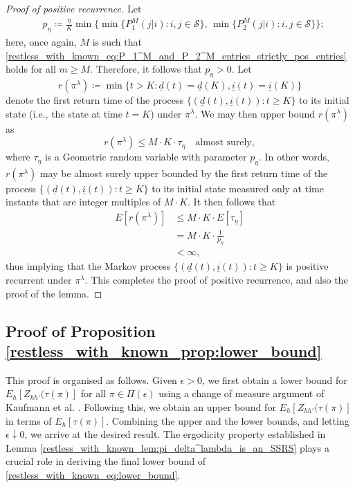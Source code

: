 \begin{proof}[Proof of positive recurrence]
	 Let 
\begingroup \allowdisplaybreaks\begin{align}
	& p_\eta\coloneqq \frac{\eta}{K}\min\bigg\lbrace \min\{P_1^{M}(j|i):i,j\in\mathcal{S}\},\,\min\{P_2^{M}(j|i):i,j\in\mathcal{S}\} \bigg\rbrace;\label{restless_with_known_eq:p_delta_strictly_positive}
\end{align}\endgroup
here, once again, $M$ is such that \eqref{restless_with_known_eq:P_1^M_and_P_2^M_entries_strictly_pos_entries} holds for all $m\geq M$. Therefore, it follows that $p_\eta>0$. Let 
\begin{equation}
	r(\pi^\lambda)\coloneqq\min\{t> K:\underline{d}(t)=\underline{d}(K),\underline{i}(t)=\underline{i}(K)\}\label{restless_with_known_eq:tau(pi_delta^lambda)}
\end{equation}
denote the first return time of the process $\{(\underline{d}(t), \underline{i}(t)):t\geq K\}$ to its initial state (i.e., the state at time $t=K$) under $\pi^\lambda$. We may then upper bound $r(\pi^\lambda)$ as
\begin{equation}
	r(\pi^\lambda)\leq M\cdot K\cdot \tau_{\eta}\quad \text{almost surely},\label{restless_with_known_eq:r(pi_delta^lambda)_as_upper_bound}
\end{equation}
where $\tau_\eta$ is a Geometric random variable with parameter $p_\eta$. In other words, $r(\pi^\lambda)$ may be almost surely upper bounded by the first return time of the process $\{(\underline{d}(t), \underline{i}(t)):t\geq K\}$ to its initial state measured only at time instants that are integer multiples of $M\cdot K$. It then follows that
\begin{align}
	E\left[r(\pi^\lambda)\right]&\leq M\cdot K\cdot E[\tau_\eta]\nonumber\\
	&=M\cdot K\cdot \frac{1}{p_\eta}\nonumber\\
	&<\infty,\label{restless_with_known_eq:sup_first_moment_of_return_time_finite}
\end{align}
thus implying that the Markov process $\{(\underline{d}(t), \underline{i}(t)):t\geq K\}$ is positive recurrent under $\pi^\lambda$. This completes the proof of positive recurrence, and also the proof of the lemma.
\end{proof}

\subsection{Proof of Proposition \ref{restless_with_known_prop:lower_bound}}\label{restless_with_known_appndx:proof_of_prop_lower_bound}
This proof is organised as follows. Given $\epsilon>0$, we first obtain a lower bound for $E_h[Z_{hh'}(\tau(\pi)]$ for all $\pi\in\Pi(\epsilon)$ using a change of measure argument of Kaufmann et al. \cite{Kaufmann2016}. Following this, we obtain an upper bound for $E_h[Z_{hh'}(\tau(\pi)]$ in terms of $E_h[\tau(\pi)]$. Combining the upper and the lower bounds, and letting $\epsilon\downarrow 0$, we arrive at the desired result. The ergodicity property established in Lemma \ref{restless_with_known_lem:pi_delta^lambda_is_an_SSRS} plays a crucial role in deriving the final lower bound of \eqref{restless_with_known_eq:lower_bound}.

